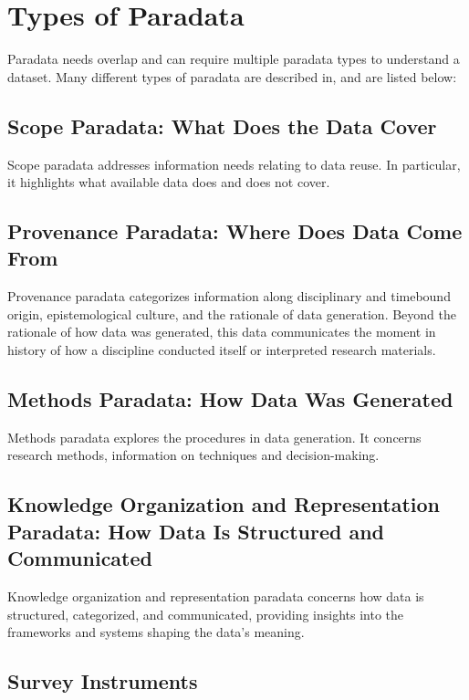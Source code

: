 \documentclass[class=article, crop=false]{standalone}
\begin{document}
\section{Types of Paradata}
\label{first}

Paradata needs overlap and can require multiple paradata types to understand a dataset.
Many different types of paradata are described in, \cite{huvilaPerspectivesParadataResearch2024} and are listed below:

\subsection{Scope Paradata: What Does the Data Cover}
\label{first}

Scope paradata addresses information needs relating to data reuse.
In particular, it highlights what available data does and does not cover.

\subsection{Provenance Paradata: Where Does Data Come From}
\label{first}

Provenance paradata categorizes information along disciplinary and timebound origin, epistemological culture, and the rationale of data generation.
Beyond the rationale of how data was generated, this data communicates the moment in history of how a discipline conducted itself or interpreted research materials.

\subsection{Methods Paradata: How Data Was Generated}
\label{first}

Methods paradata explores the procedures in data generation.
It concerns research methods, information on techniques and decision-making.

\subsection{Knowledge Organization and Representation Paradata: How Data Is Structured and Communicated}
\label{first}

Knowledge organization and representation paradata concerns how data is structured, categorized, and communicated, providing insights into the frameworks and systems shaping the data’s meaning.


\subsection{Survey Instruments}
\end{document}
